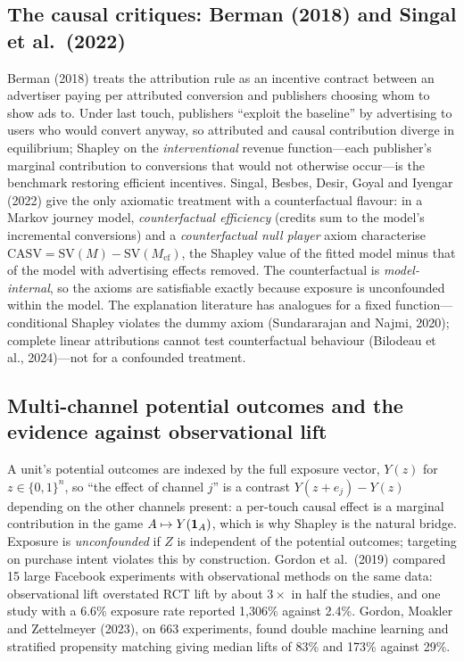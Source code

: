 \subsection{The causal critiques: Berman (2018) and Singal et al.\ (2022)}

Berman (2018) treats the attribution rule as an incentive contract between an advertiser paying per attributed conversion and publishers choosing whom to show ads to. Under last touch, publishers ``exploit the baseline'' by advertising to users who would convert anyway, so attributed and causal contribution diverge in equilibrium; Shapley on the \emph{interventional} revenue function---each publisher's marginal contribution to conversions that would not otherwise occur---is the benchmark restoring efficient incentives. Singal, Besbes, Desir, Goyal and Iyengar (2022) give the only axiomatic treatment with a counterfactual flavour: in a Markov journey model, \emph{counterfactual efficiency} (credits sum to the model's incremental conversions) and a \emph{counterfactual null player} axiom characterise $\mathrm{CASV} = \mathrm{SV}(M) - \mathrm{SV}(M_{\mathrm{cf}})$, the Shapley value of the fitted model minus that of the model with advertising effects removed. The counterfactual is \emph{model-internal}, so the axioms are satisfiable exactly because exposure is unconfounded within the model. The explanation literature has analogues for a fixed function---conditional Shapley violates the dummy axiom (Sundararajan and Najmi, 2020); complete linear attributions cannot test counterfactual behaviour (Bilodeau et al., 2024)---not for a confounded treatment.

\subsection{Multi-channel potential outcomes and the evidence against observational lift}

A unit's potential outcomes are indexed by the full exposure vector, $Y(z)$ for $z \in \{0,1\}^n$, so ``the effect of channel $j$'' is a contrast $Y(z + e_j) - Y(z)$ depending on the other channels present: a per-touch causal effect is a marginal contribution in the game $A \mapsto Y(\mathbf{1}_A)$, which is why Shapley is the natural bridge. Exposure is \emph{unconfounded} if $Z$ is independent of the potential outcomes; targeting on purchase intent violates this by construction. Gordon et al.\ (2019) compared 15 large Facebook experiments with observational methods on the same data: observational lift overstated RCT lift by about $3\times$ in half the studies, and one study with a 6.6\% exposure rate reported 1,306\% against 2.4\%. Gordon, Moakler and Zettelmeyer (2023), on 663 experiments, found double machine learning and stratified propensity matching giving median lifts of 83\% and 173\% against 29\%.

